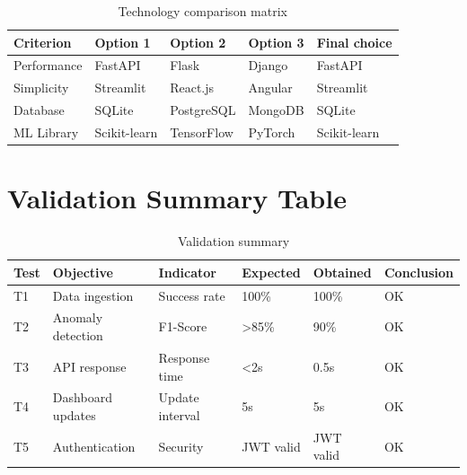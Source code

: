 \begin{table}[H]
\centering
\caption{Technology comparison matrix}
\begin{tabular}{|p{2cm}|p{2cm}|p{2cm}|p{2cm}|p{3cm}|}
\hline
\textbf{Criterion} & \textbf{Option 1} & \textbf{Option 2} & \textbf{Option 3} & \textbf{Final choice} \\
\hline
Performance & FastAPI & Flask & Django & FastAPI \\
\hline
Simplicity & Streamlit & React.js & Angular & Streamlit \\
\hline
Database & SQLite & PostgreSQL & MongoDB & SQLite \\
\hline
ML Library & Scikit-learn & TensorFlow & PyTorch & Scikit-learn \\
\hline
\end{tabular}
\end{table}

\section{Validation Summary Table}

\begin{table}[H]
\centering
\caption{Validation summary}
\begin{tabular}{|p{2cm}|p{3cm}|p{2cm}|p{2cm}|p{2cm}|p{2cm}|}
\hline
\textbf{Test} & \textbf{Objective} & \textbf{Indicator} & \textbf{Expected} & \textbf{Obtained} & \textbf{Conclusion} \\
\hline
T1 & Data ingestion & Success rate & 100\% & 100\% & OK \\
\hline
T2 & Anomaly detection & F1-Score & >85\% & 90\% & OK \\
\hline
T3 & API response & Response time & <2s & 0.5s & OK \\
\hline
T4 & Dashboard updates & Update interval & 5s & 5s & OK \\
\hline
T5 & Authentication & Security & JWT valid & JWT valid & OK \\
\hline
\end{tabular}
\end{table}
